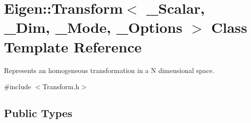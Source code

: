\hypertarget{class_eigen_1_1_transform}{}\section{Eigen\+::Transform$<$ \+\_\+\+Scalar, \+\_\+\+Dim, \+\_\+\+Mode, \+\_\+\+Options $>$ Class Template Reference}
\label{class_eigen_1_1_transform}


Represents an homogeneous transformation in a N dimensional space.  




{\ttfamily \#include $<$Transform.\+h$>$}

\subsection*{Public Types}

